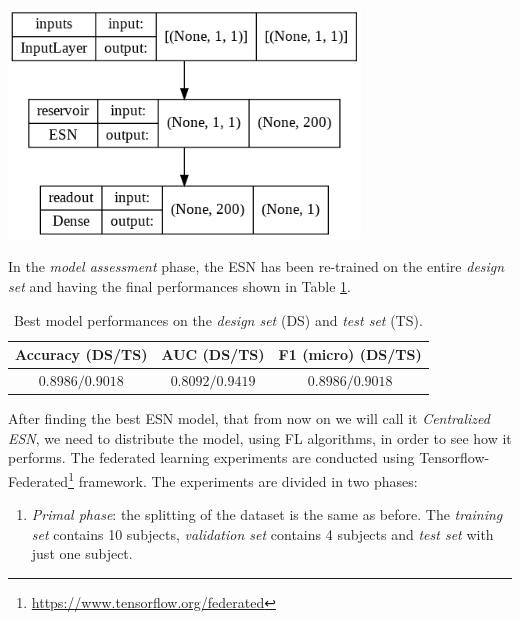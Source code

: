 {{\begin{center}
\begin{minipage}[c]{\textwidth}
    \centering
    \includegraphics[width=0.7\textwidth]{contents/Chapter6/esn.png}
    \label{fig:esn}
\end{minipage}
\end{center}

In the \textit{model assessment} phase, the ESN has been re-trained on the entire \textit{design set} and having the final performances shown in Table \ref{tab:best_model_perf}.

{\renewcommand{\arraystretch}{1.5}
\begin{table}[H]
    \centering
    \begin{tabular}{|c|c|c|}
        \hline
        Accuracy (DS/TS) & AUC (DS/TS) & F1 (micro) (DS/TS) \\ \hline\hline
        $0.8986/0.9018$ & $0.8092/0.9419$ & $0.8986/0.9018$ \\ \hline
    \end{tabular}
    \caption{Best model performances on the \textit{design set} (DS) and \textit{test set} (TS).}
    \label{tab:best_model_perf}
\end{table}


After finding the best ESN model, that from now on we will call it \textit{Centralized ESN}, we need to distribute the model, using FL algorithms, in order to see how it performs. The federated learning experiments are conducted using Tensorflow-Federated\footnote{\url{https://www.tensorflow.org/federated}} framework. The experiments are divided in two phases:

\begin{enumerate}
    \item \textit{Primal phase}: the splitting of the dataset is the same as before. The \textit{training set} contains 10 subjects, \textit{validation set} contains 4 subjects and \textit{test set} with just one subject.
    

\end{enumerate}}}}
